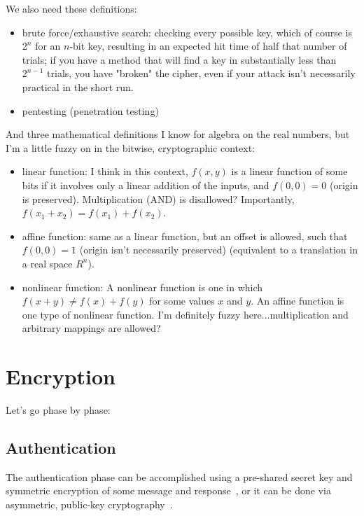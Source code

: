 \documentclass[%
 aip,
 jmp,%
 amsmath,amssymb,
 reprint,%
]{revtex4-1}
\begin{document}
We also need these definitions:

\begin{itemize}
\item brute force/exhaustive search: checking every possible key, which of
  course is $2^n$ for an $n$-bit key, resulting in an expected hit time of
  half that number of trials; if you have a method that will find a
  key in substantially less than $2^{n-1}$ trials, you have "broken" the
  cipher, even if your attack isn't necessarily practical in the short
  run.
\item pentesting (penetration testing)
\end{itemize}

And three mathematical definitions I know for algebra on the real
numbers, but I'm a little fuzzy on in the bitwise, cryptographic
context:

\begin{itemize}
\item linear function: I think in this context, $f(x,y)$ is a linear
  function of some bits if it involves only a linear addition of
  the inputs, and $f(0,0) = 0$ (origin is preserved).  Multiplication
  (AND) is disallowed?  Importantly, $f(x_1 + x_2) = f(x_1) + f(x_2)$.
\item affine function: same as a linear function, but an offset is
  allowed, such that $f(0,0) = 1$ (origin isn't necessarily preserved)
  (equivalent to a translation in a real space $R^n$).
\item nonlinear function: A nonlinear function is one in which $f(x+y) \ne f(x) + f(y)$ for some values $x$ and $y$. An affine function is one type of nonlinear function. I'm definitely fuzzy here...multiplication and
  arbitrary mappings are allowed?
\end{itemize}

\section{Encryption}

Let's go phase by phase:

\subsection{Authentication}

The authentication phase can be accomplished using a pre-shared secret
key and symmetric encryption of some message and
response~\cite{needham:encrypt}, or it can be done via
asymmetric, public-key cryptography~\cite{rivest78:_rsa}.
\end{document}
